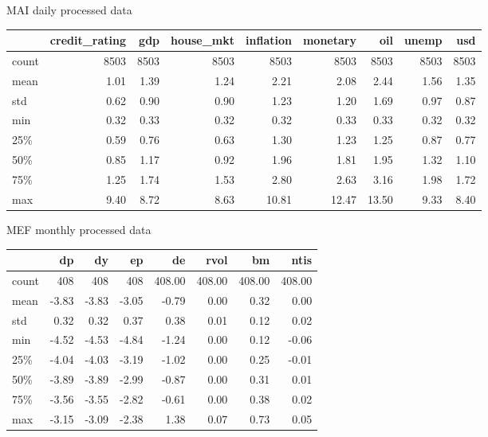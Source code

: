 \documentclass{article}
\begin{document}
\newline

\bigskip
MAI daily processed data

\begin{tabular}{lrrrrrrrr}
\toprule
{} &  credit\_rating &    gdp &  house\_mkt &  inflation &  monetary &   oil &  unemp &   usd \\
\midrule
count &        8503 & 8503 &    8503 &    8503 &   8503 & 8503 & 8503 & 8503 \\
mean  &           1.01 &    1.39 &       1.24 &       2.21 &      2.08 &    2.44 &    1.56 &    1.35 \\
std   &           0.62 &    0.90 &       0.90 &       1.23 &      1.20 &    1.69 &    0.97 &    0.87 \\
min   &           0.32 &    0.33 &       0.32 &       0.32 &      0.33 &    0.33 &    0.32 &    0.32 \\
25\%   &           0.59 &    0.76 &       0.63 &       1.30 &      1.23 &    1.25 &    0.87 &    0.77 \\
50\%   &           0.85 &    1.17 &       0.92 &       1.96 &      1.81 &    1.95 &    1.32 &    1.10 \\
75\%   &           1.25 &    1.74 &       1.53 &       2.80 &      2.63 &    3.16 &    1.98 &    1.72 \\
max   &           9.40 &    8.72 &       8.63 &      10.81 &     12.47 &   13.50 &    9.33 &    8.40 \\
\bottomrule
\end{tabular}

\newpage

\bigskip
MEF monthly processed data

\begin{tabular}{lrrrrrrr}
\toprule
{} &    dp &    dy &    ep &    de &  rvol &    bm &  ntis \\
\midrule
count &  408 &  408 &  408 &  408.00 &  408.00 &  408.00 &  408.00 \\
mean  &   -3.83 &   -3.83 &   -3.05 &   -0.79 &    0.00 &    0.32 &    0.00 \\
std   &    0.32 &    0.32 &    0.37 &    0.38 &    0.01 &    0.12 &    0.02 \\
min   &   -4.52 &   -4.53 &   -4.84 &   -1.24 &    0.00 &    0.12 &   -0.06 \\
25\%   &   -4.04 &   -4.03 &   -3.19 &   -1.02 &    0.00 &    0.25 &   -0.01 \\
50\%   &   -3.89 &   -3.89 &   -2.99 &   -0.87 &    0.00 &    0.31 &    0.01 \\
75\%   &   -3.56 &   -3.55 &   -2.82 &   -0.61 &    0.00 &    0.38 &    0.02 \\
max   &   -3.15 &   -3.09 &   -2.38 &    1.38 &    0.07 &    0.73 &    0.05 \\
\bottomrule
\end{tabular}
\end{document}
